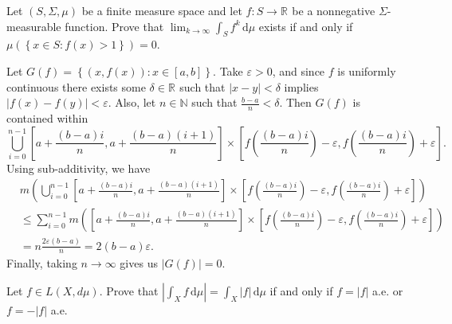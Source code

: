 \pagebreak

\begin{problem}{2}
  Let $\left( S, \Sigma, \mu \right)$ be a finite measure space and let $f : S \to \mathbb{R}^{} $ be a nonnegative $\Sigma$-measurable function.
  Prove that $\lim_{k \to \infty} \int_{S} \! f^{k} \, \mathrm{d}\mu $ exists if and only if \\
  $\mu\left( \left\{ x \in S : f(x) > 1 \right\} \right) = 0$.
\end{problem}
    
\begin{solution}
  Let $G(f) = \left\{ (x,f(x)) : x \in [a,b] \right\}$.
  Take $\varepsilon > 0$, and since $f$ is uniformly continuous there exists some $\delta \in \mathbb{R}^{}$ such that $\left| x - y \right| < \delta$ implies $\left| f(x) - f(y) \right|<\varepsilon$.
  Also, let $n \in \mathbb{N}$ such that $\frac{b-a}{n} < \delta$.
  Then $G(f)$ is contained within 
  \[
    \bigcup_{i=0}^{n-1} \left[a + \frac{(b-a)i}{n}, a + \frac{(b-a)(i+1)}{n} \right] \times \left[ f\left( \frac{(b-a)i}{n} \right) - \varepsilon, f\left( \frac{(b-a)i}{n}\right)  + \varepsilon \right]
  .\] 
  Using sub-additivity, we have
  \begin{equation*}
    \begin{split}
      &m\left( \bigcup_{i=0}^{n-1} \left[a + \frac{(b-a)i}{n}, a + \frac{(b-a)(i+1)}{n} \right] \times \left[ f\left( \frac{(b-a)i}{n} \right) - \varepsilon, f\left( \frac{(b-a)i}{n}\right)  + \varepsilon \right] \right) \\ 
      &\leq \sum_{i=0}^{n-1} m\left(  \left[a + \frac{(b-a)i}{n}, a + \frac{(b-a)(i+1)}{n} \right] \times \left[ f\left( \frac{(b-a)i}{n} \right) - \varepsilon, f\left( \frac{(b-a)i}{n}\right)  + \varepsilon \right] \right)\\
      &= n \frac{2\varepsilon(b-a)}{n} = 2(b-a)\varepsilon.
    \end{split}
  \end{equation*}
  Finally, taking $n \to \infty$ gives us $\left| G(f) \right| = 0$.
\end{solution}

\pagebreak

\begin{problem}{3}
  Let $f \in L\left( X,d \mu \right)$. Prove that $\left| \int_{X} \! f \, \mathrm{d}\mu  \right| = \int_{X} \! \left| f \right| \, \mathrm{d}\mu $ if and only if $f = \left| f \right|$ a.e. or $f = - \left| f \right|$ a.e.
\end{problem}

